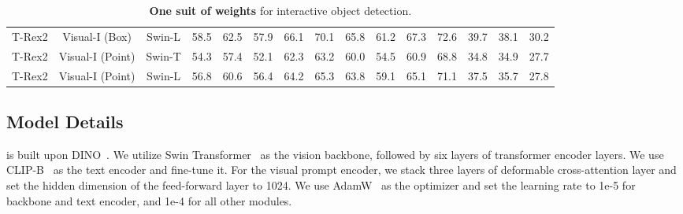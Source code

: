 \begin{table}[h]
{\begin{tabular}{ccc|c|cccccccc|cc|c}
        T-Rex2                  & Visual-I (Box)                                                          & Swin-L                    & 58.5                                                         & 62.5          & 57.9          & 66.1          & \multicolumn{1}{c|}{70.1}          & 65.8          & 61.2          & 67.3          & 72.6          & 39.7                                   & 38.1                                  & 30.2                                                            \\
        T-Rex2                  & Visual-I (Point)                                                        & Swin-T                    & 54.3                                                         & 57.4          & 52.1          & 62.3          & \multicolumn{1}{c|}{63.2}          & 60.0          & 54.5          & 60.9          & 68.8          & 34.8                                   & 34.9                                  & 27.7                                                            \\
        T-Rex2                  & Visual-I (Point)                                                        & Swin-L                    & 56.8                                                         & 60.6          & 56.4          & 64.2          & \multicolumn{1}{c|}{65.3}          & 63.8          & 59.1          & 65.1          & 71.1          & 37.5                                   & 35.7                                  & 27.8                                                            \\ \hline
        \end{tabular}}
    \caption{\textbf{One suit of weights} for interactive object detection.}
    \label{tab:main_result_2}
    \end{table}

\subsection{Model Details}
\ourmodel{} is built upon DINO~\cite{zhang2022dino}. We utilize Swin Transformer~\cite{liu2021swin} as the vision backbone, followed by six layers of transformer encoder layers. We use CLIP-B~\cite{clip} as the text encoder and fine-tune it. For the visual prompt encoder, we stack three layers of deformable cross-attention layer and set the hidden dimension of the feed-forward layer to 1024. We use AdamW~\cite{loshchilov2017decoupled} as the optimizer and set the learning rate to 1e-5 for backbone and text encoder, and 1e-4 for all other modules.

